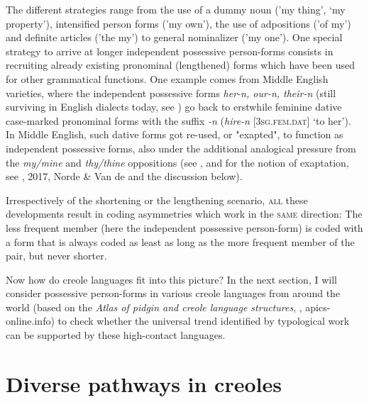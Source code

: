 \documentclass[output=paper]{langsci/langscibook}
\begin{document}
The different strategies range from the use of a dummy noun ('my thing', `my property'), intensified person forms ('my own'), the use of adpositions ('of my') and definite articles ('the my') to general nominalizer ('my one'). One special strategy to arrive at longer independent possessive person-forms consists in recruiting already existing pronominal (lengthened) forms which have been used for other grammatical functions. One example comes from Middle English varieties, where the independent possessive forms \textit{her-n, our-n, their-n} (still surviving in English dialects today, see \citealt{KortmannLunkenheimer2011}) go back to erstwhile feminine dative case-marked pronominal forms with the suffix \textit{{}-n} (\textit{hire-n} [\textsc{3sg.fem.dat}] `to her'). In Middle English, such dative forms got re-used, or "exapted", to function as independent possessive forms, also under the additional analogical pressure from the \textit{my/mine} and \textit{thy/thine} oppositions (see \citealt{Allen2002}, and for the notion of exaptation, see \citealt{Lass1990}, 2017, Norde \& Van de \citealt{Velde2016} and the discussion below). 

Irrespectively of the shortening or the lengthening scenario, \textsc{all} these developments result in coding asymmetries which work in the \textsc{same} direction: The less frequent member (here the independent possessive person-form) is coded with a form that is always coded as least as long as the more frequent member of the pair, but never shorter.

Now how do creole languages fit into this picture? In the next section, I will consider possessive person-forms in various creole languages from around the world (based on the \textit{Atlas of pidgin and creole language structures}, \citealt{MichaelisEtAl2013}, apics-online.info) to check whether the universal trend identified by typological work can be supported by these high-contact languages.

\section{Diverse pathways in creoles}
\end{document}
